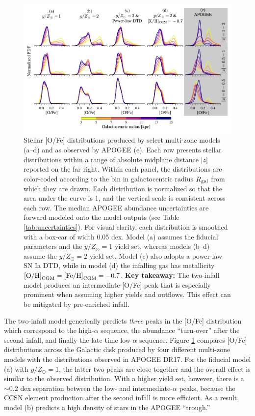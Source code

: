 \documentclass[twocolumn,twocolappendix,linenumbers]{aastex631}
\newcommand{\mathOH}{{\rm [O/H]}}
\newcommand{\mathFeH}{{\rm [Fe/H]}}
\newcommand{\yZ}[1]{$y/Z_\odot=#1$}
\begin{document}
\begin{figure}
    \centering
    \includegraphics{src/tex/figures/ofe_df_comparison.pdf}
    \caption{Stellar [O/Fe] distributions produced by select multi-zone models (a--d) and as observed by APOGEE (e). Each row presents stellar distributions within a range of absolute midplane distance $|z|$ reported on the far right. Within each panel, the distributions are color-coded according to the bin in galactocentric radius $R_{\rm gal}$ from which they are drawn. Each distribution is normalized so that the area under the curve is 1, and the vertical scale is consistent across each row. The median APOGEE abundance uncertainties are forward-modeled onto the model outputs (see Table \ref{tab:uncertainties}). For visual clarity, each distribution is smoothed with a box-car of width 0.05 dex. Model (a) assumes the fiducial parameters and the \yZ{1} yield set, whereas models (b--d) assume the \yZ{2} yield set. Model (c) also adopts a power-law SN Ia DTD, while in model (d) the infalling gas has metallicity $\mathOH_{\rm CGM}=\mathFeH_{\rm CGM}=-0.7$. {\bf Key takeaway:} The two-infall model produces an intermediate-[O/Fe] peak that is especially prominent when assuming higher yields and outflows. This effect can be mitigated by pre-enriched infall.}
    \label{fig:ofe-df}
\end{figure}

The two-infall model generically predicts {\it three} peaks in the [O/Fe] distribution which correspond to the high-$\alpha$ sequence, the abundance ``turn-over'' after the second infall, and finally the late-time low-$\alpha$ sequence. Figure \ref{fig:ofe-df} compares [O/Fe] distributions across the Galactic disk produced by four different multi-zone models with the distributions observed in APOGEE DR17. For the fiducial model (a) with $y/Z_\odot=1$, the latter two peaks are close together and the overall effect is similar to the observed distribution. With a higher yield set, however, there is a $\sim0.2$ dex separation between the low- and intermediate-$\alpha$ peaks, because the CCSN element production after the second infall is more efficient. As a result, model (b) predicts a high density of stars in the APOGEE ``trough.''
\end{document}
